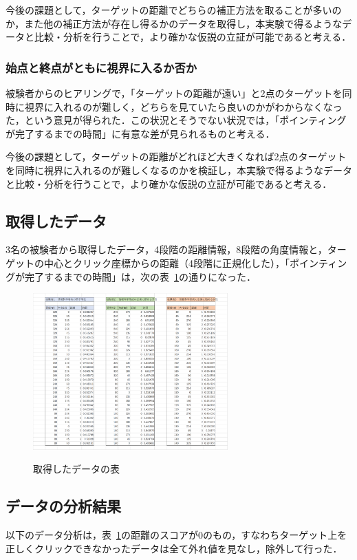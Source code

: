 \documentclass[a4paper, papersize, titlepage]{jsarticle}
\begin{document}
\begin{multicols}{2}
今後の課題として，ターゲットの距離でどちらの補正方法を取ることが多いのか，また他の補正方法が存在し得るかのデータを取得し，本実験で得るようなデータと比較・分析を行うことで，より確かな仮説の立証が可能であると考える．

\subsubsection{始点と終点がともに視界に入るか否か}
被験者からのヒアリングで，「ターゲットの距離が遠い」と2点のターゲットを同時に視界に入れるのが難しく，どちらを見ていたら良いのかがわからなくなった，という意見が得られた．この状況とそうでない状況では，「ポインティングが完了するまでの時間」に有意な差が見られるものと考える．

今後の課題として，ターゲットの距離がどれほど大きくなれば2点のターゲットを同時に視界に入れるのが難しくなるのかを検証し，本実験で得るようなデータと比較・分析を行うことで，より確かな仮説の立証が可能であると考える．

\subsection{取得したデータ}
3名の被験者から取得したデータ，4段階の距離情報，8段階の角度情報と，ターゲットの中心とクリック座標からの距離（4段階に正規化した），「ポインティングが完了するまでの時間」は，次の表~\ref{table}の通りになった．

\renewcommand{\figurename}{表}
\begin{figure}[H]
 \centering
 \caption{取得したデータの表}
   \includegraphics[width=75mm]{table.png}
 \label{table}
\end{figure}
\noindent

\subsection{データの分析結果}
以下のデータ分析は，表~\ref{table}の距離のスコアが0のもの，すなわちターゲット上を正しくクリックできなかったデータは全て外れ値を見なし，除外して行った．


\end{multicols}
\end{document}
